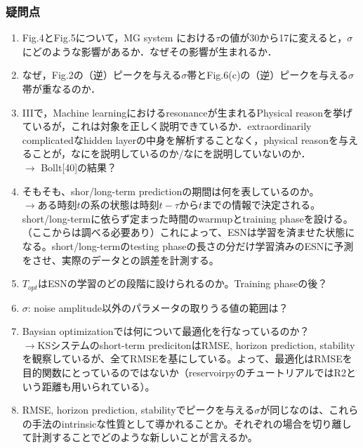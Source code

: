 \subsubsection{疑問点}
\begin{enumerate}
  \item Fig.4とFig.5について，MG system における$\tau$の値が30から17に変えると，$\sigma$にどのような影響があるか．なぜその影響が生まれるか．
  \item なぜ，Fig.2の（逆）ピークを与える$\sigma$帯とFig.6(c)の（逆）ピークを与える$\sigma$帯が重なるのか．
  \item IIIで，Machine learningにおけるresonanceが生まれるPhysical reasonを挙げているが，これは対象を正しく説明できているか．extraordinarily complicatedなhidden layerの中身を解析することなく，physical reasonを与えることが，なにを説明しているのか/なにを説明していないのか．
  \\$\longrightarrow$ Bollt[40]の結果？
  \item そもそも、shor/long-term predictionの期間は何を表しているのか。
  \\$\longrightarrow$ある時刻$t$の系の状態は時刻$t - \tau$から$t$までの情報で決定される。
  short/long-termに依らず定まった時間のwarmupとtraining phaseを設ける。
  （ここからは調べる必要あり）これによって、ESNは学習を済ませた状態になる。short/long-termのtesting phaseの長さの分だけ学習済みのESNに予測をさせ、実際のデータとの誤差を計測する。
  \item $T_{opt}$はESNの学習のどの段階に設けられるのか。Training phaseの後？
  \item $\sigma$: noise amplitude以外のパラメータの取りうる値の範囲は？
  \item Baysian optimizationでは何について最適化を行なっているのか？
  \\$\longrightarrow$KSシステムのshort-term predicitonはRMSE, horizon prediction, stabilityを観察しているが、全てRMSEを基にしている。よって、最適化はRMSEを目的関数にとっているのではないか（reservoirpyのチュートリアルではR2という距離も用いられている）。
  \item RMSE, horizon prediction, stabilityでピークを与える$\sigma$が同じなのは、これらの手法のintrinsicな性質として導かれることか。それぞれの場合を切り離して計測することでどのような新しいことが言えるか。
\end{enumerate}


